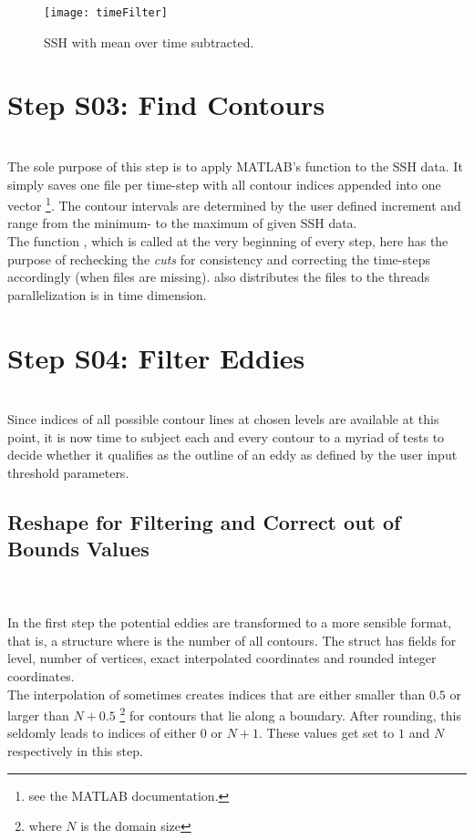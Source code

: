 \begin{figure*}
	\texttt{[image: timeFilter]}
	\caption{SSH with mean over time subtracted.}
	\label{fig:timeFilter}
\end{figure*}
 \section{Step S03: Find Contours} \label{S:03}
\\
The sole purpose of this step is to apply MATLAB's  function
to the SSH data. It simply saves one file per time-step with all contour indices
appended into one vector \footnote{see the MATLAB documentation.}. The contour
intervals are determined by the user defined increment and range from the
minimum- to the maximum of given SSH data. \\
The function , which is called at the very beginning of
every step, here has the purpose of rechecking the \textit{cuts} for
consistency and correcting the time-steps accordingly (\ie when files are
missing).  also distributes the files to the threads \ie
parallelization is in time dimension.
\section{Step S04: Filter Eddies} \label{S:04}
\\
Since indices of all possible contour lines at chosen levels are available at
this point, it is now time to subject each and every contour to a
myriad of tests to decide whether it qualifies as the outline of an eddy as
defined by the user input threshold parameters.
\subsection{Reshape for Filtering and Correct out of Bounds Values}
\\
\noindent{}\\
In the first step the potential eddies are transformed to a more sensible
format, that is, a structure  where 
is the number of all contours. The struct has fields for level, number of
vertices, exact \ie interpolated coordinates and rounded integer coordinates.\\
The interpolation of  sometimes creates indices that are
either smaller than $0.5$ or larger than $N+0.5$ \footnote{where $N$ is the
domain size} for contours that lie along a boundary. After rounding, this
seldomly leads to indices of either $0$ or $N+1$. These values get set to $1$
and $N$ respectively in this step.
